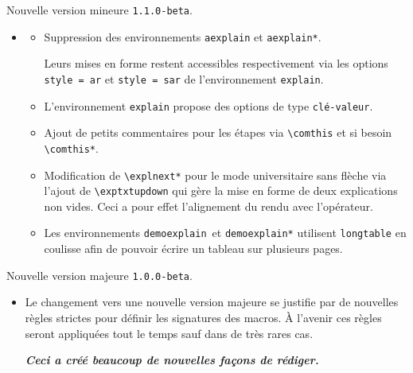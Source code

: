 \documentclass[12pt,a4paper]{book}
\makeatletter
\newcommand\env[1]{\texttt{#1}}
\newcommand\macro[1]{\env{\textbackslash{}#1}}
\theoremstyle{definition}
\newcommand\topic{\@ifstar{\@topic@star}{\@topic@no@star}}
\newcommand\@topic@no@star[1]{%
	\textbf{\textsc{#1}.}%
}
\newcommand\@topic@star[1]{%
	\textbf{\textsc{#1} :}%
}
\makeatother
\begin{document}
{{\begin{description}
    \medskip
    \item[2020-06-27] Nouvelle version mineure \verb+1.1.0-beta+.
    
    \begin{itemize}[itemsep=.5em]
        \item \topic{Logique}
        \begin{itemize}[itemsep=.5em]
            \item Suppression des environnements \env{aexplain} et \env{aexplain*}.
    
                  \smallskip
    
                  Leurs mises en forme restent accessibles respectivement via les options \verb+style = ar+ et \verb+style = sar+ de l'environnement \env{explain}.
    
    
            \item L'environnement \env{explain} propose des options de type \texttt{clé-valeur}.
    
    
            \item Ajout de petits commentaires pour les étapes via \macro{comthis} et si besoin \macro{comthis*}.
    
    
            \item Modification de \macro{explnext*} pour le mode universitaire sans flèche via l'ajout de \macro{exptxtupdown} qui gère la mise en forme de deux explications non vides.
                  Ceci a pour effet l'alignement du rendu avec l'opérateur.
    
    
            \item Les environnements \env{demoexplain} et \env{demoexplain*} utilisent \env{longtable} en coulisse afin de pouvoir écrire un tableau sur plusieurs pages.
        \end{itemize}
    \end{itemize}


    \medskip
    \item[2020-06-21] Nouvelle version majeure \verb+1.0.0-beta+.
    
    \begin{itemize}[itemsep=.5em]
        \item Le changement vers une nouvelle version majeure se justifie par de nouvelles règles strictes pour définir les signatures des macros. À l'avenir ces règles seront appliquées tout le temps sauf dans de très rares cas.
        \begin{center}
    		\bfseries\itshape
    		Ceci a créé beaucoup de nouvelles façons de rédiger.
        \end{center}
    

\end{itemize}
\end{description}}}
\end{document}
